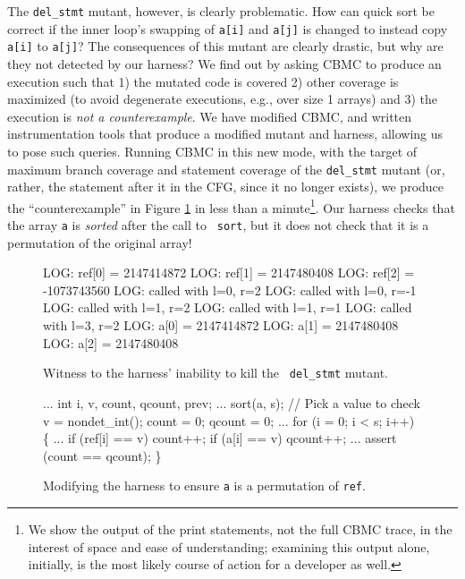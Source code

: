 \documentclass[conference]{IEEEtran}
\begin{document}
The {\tt del\_stmt} mutant, however, is clearly problematic.  How can
quick sort be correct if the inner loop's swapping of {\tt a[i]} and
{\tt a[j]} is changed to instead copy {\tt a[i]} to {\tt a[j]}?  The
consequences of this mutant are clearly drastic, but why are they not
detected by our harness?  We find out by asking CBMC to produce an
execution such that 1) the mutated code is covered 2) other coverage
is maximized (to avoid degenerate executions, e.g., over size 1
arrays) and 3) the execution is \emph{not a counterexample}.  We have
modified CBMC, and written instrumentation tools that produce a
modified mutant and harness, allowing us to pose such queries.
Running CBMC in this new mode, with the target of maximum branch
coverage and statement coverage of the {\tt del\_stmt} mutant (or,
rather, the statement after it in the CFG, since it no longer exists),
we produce the ``counterexample'' in Figure \ref{fig:witness1} in less
than a minute\footnote{We show the output of the print statements, not
  the full CBMC trace, in the interest of space and ease of
  understanding; examining this output alone, initially, is the most
  likely course of action for a developer as well.}.  Our harness
checks that the array {\tt a} is \emph{sorted} after the call to {\tt
  sort}, but it does not check that it is a permutation of the
original array!

\begin{figure}
{\scriptsize
\begin{code}
LOG: ref[0] = 2147414872
LOG: ref[1] = 2147480408
LOG: ref[2] = -1073743560
LOG: called with l=0, r=2
LOG: called with l=0, r=-1
LOG: called with l=1, r=2
LOG: called with l=1, r=1
LOG: called with l=3, r=2
LOG: a[0] = 2147414872
LOG: a[1] = 2147480408
LOG: a[2] = 2147480408
\end{code}
}
\caption{Witness to the harness' inability to kill the {\tt
    del\_stmt} mutant.}
\label{fig:witness1}
\end{figure}

\begin{figure}
{\scriptsize
\begin{code}
...
   int i, v, count, qcount, prev;
...
  sort(a, s);
  // Pick a value to check
  v = nondet\_int();
  count = 0;
  qcount = 0;
...
  for (i = 0; i < s; i++) \{
...
     if (ref[i] == v) 
       count++;
     if (a[i] == v) 
       qcount++;
...
   assert (count == qcount);
\}
\end{code}
}
\caption{Modifying the harness to ensure {\tt a} is a permutation of
  {\tt ref}.}
\label{fig:added}
\end{figure}
\end{document}

